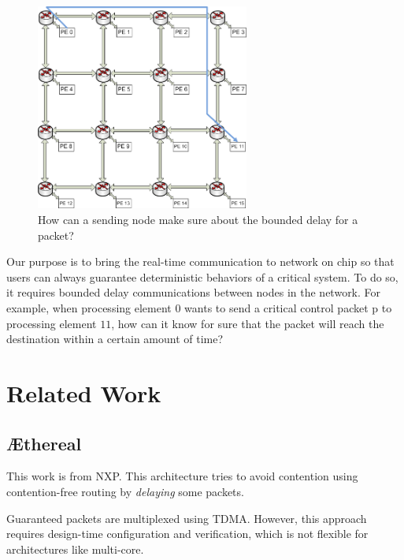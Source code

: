 \documentclass[conference, twocolumn]{IEEEtran}
\theoremstyle{definition}
\begin{document}
\begin{figure}[htp]
\centering
\includegraphics[width=7cm]{pics/NoC0}
\caption[Demand for a hard real-time flow.]
{How can a sending node make sure about the bounded delay for
a packet?}\label{fig:NoCRt}
\end{figure}

Our purpose is to bring the real-time communication to network on chip so that 
users can always guarantee deterministic behaviors of a critical system. To do 
so, it requires bounded delay communications between nodes in the network. 
For example, when processing element $0$ wants to send a critical control packet 
p to processing element $11$, how can it know for sure that the packet will
reach the destination within a certain amount of time? 

\section{Related Work}
\subsection{\AE thereal}
This work \cite{Goossens_chapter4} is from NXP. This architecture tries to avoid
contention using contention-free routing by {\em delaying} some packets. 

Guaranteed packets are multiplexed using TDMA. However, this approach requires
design-time configuration and verification, which is not flexible for architectures
like multi-core.
\end{document}
